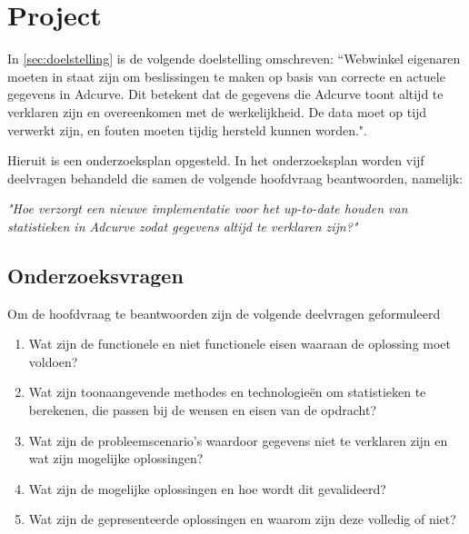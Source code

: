 \chapter{Project}

In \ref{sec:doelstelling} is de volgende doelstelling omschreven: ``Webwinkel eigenaren moeten in staat zijn om beslissingen te maken op basis van correcte en actuele gegevens in Adcurve. Dit betekent dat de gegevens die Adcurve toont altijd te verklaren zijn en overeenkomen met de werkelijkheid. De data moet op tijd verwerkt zijn, en fouten moeten tijdig hersteld kunnen worden.". 

Hieruit is een onderzoeksplan opgesteld. In het onderzoeksplan worden vijf deelvragen behandeld die samen de volgende hoofdvraag beantwoorden, namelijk:

{\large \textit{"Hoe verzorgt een nieuwe implementatie voor het up-to-date houden van statistieken in Adcurve zodat gegevens altijd te verklaren zijn?"}}
\medskip

\section{Onderzoeksvragen}

Om de hoofdvraag te beantwoorden zijn de volgende deelvragen geformuleerd

\begin{enumerate}
\item Wat zijn de functionele en niet functionele eisen waaraan de oplossing moet voldoen?
\item Wat zijn toonaangevende methodes en technologieën om statistieken te berekenen, die passen bij de wensen en eisen van de opdracht?
\item Wat zijn de probleemscenario's waardoor gegevens niet te verklaren zijn en wat zijn mogelijke oplossingen?
\item Wat zijn de mogelijke oplossingen en hoe wordt dit gevalideerd?
\item Wat zijn de gepresenteerde oplossingen en waarom zijn deze volledig of niet?
\end{enumerate}


